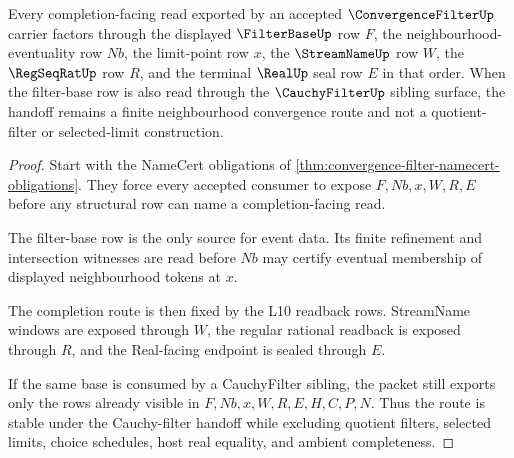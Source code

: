 \begin{theorem}\label{thm:convergence-filter-completion-handoff}
Every completion-facing read exported by an accepted $\ConvergenceFilterUp$ carrier factors through the displayed $\FilterBaseUp$ row $F$, the neighbourhood-eventuality row $Nb$, the limit-point row $x$, the $\StreamNameUp$ row $W$, the $\RegSeqRatUp$ row $R$, and the terminal $\RealUp$ seal row $E$ in that order. When the filter-base row is also read through the $\CauchyFilterUp$ sibling surface, the handoff remains a finite neighbourhood convergence route and not a quotient-filter or selected-limit construction.
\end{theorem}
\begin{proof}
Start with the NameCert obligations of \autoref{thm:convergence-filter-namecert-obligations}. They force every accepted consumer to expose $F,Nb,x,W,R,E$ before any structural row can name a completion-facing read.

The filter-base row is the only source for event data. Its finite refinement and intersection witnesses are read before $Nb$ may certify eventual membership of displayed neighbourhood tokens at $x$.

The completion route is then fixed by the L10 readback rows. StreamName windows are exposed through $W$, the regular rational readback is exposed through $R$, and the Real-facing endpoint is sealed through $E$.

If the same base is consumed by a CauchyFilter sibling, the packet still exports only the rows already visible in $F,Nb,x,W,R,E,H,C,P,N$. Thus the route is stable under the Cauchy-filter handoff while excluding quotient filters, selected limits, choice schedules, host real equality, and ambient completeness.
\end{proof}



